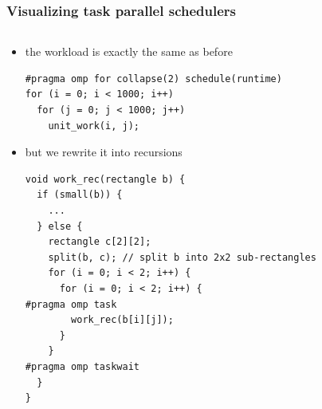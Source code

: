 \documentclass[12pt,dvipdfmx]{beamer}
\begin{document}
\begin{frame}[fragile]
\frametitle{Visualizing task parallel schedulers}
\begin{columns}
\begin{column}{0.7\textwidth}
\begin{itemize}
\item the workload is exactly the same as before
\begin{lstlisting}
#pragma omp for collapse(2) schedule(runtime)
for (i = 0; i < 1000; i++)
  for (j = 0; j < 1000; j++)
    unit_work(i, j);
\end{lstlisting}
\item but we rewrite it into recursions
\begin{lstlisting}
void work_rec(rectangle b) {
  if (small(b)) {
    ...
  } else {
    rectangle c[2][2];
    split(b, c); // split b into 2x2 sub-rectangles
    for (i = 0; i < 2; i++) {
      for (i = 0; i < 2; i++) {
#pragma omp task 
        work_rec(b[i][j]);
      }
    }
#pragma omp taskwait
  }
}
\end{lstlisting}
\end{itemize}
\end{column}

\begin{column}{0.3\textwidth}
\begin{center}
\def\svgwidth{\textwidth}
{\scriptsize }
\end{center}
\end{column}
\end{columns}
\end{frame}
\end{document}
